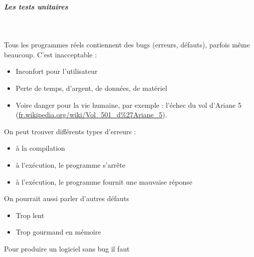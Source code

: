 \documentclass[11pt,a4paper]{article}
\begin{document}
		\subparagraph{Les tests unitaires} 
		
					\textcolor{white}{.} \par
				
          Tous les programmes r\'eels contiennent des bugs (erreurs, d\'efauts), parfois m\^eme beaucoup.
          C'est inacceptable :
          
					\begin{itemize}
				
			\item Inconfort pour l'utilisateur
			\item Perte de temps, d'argent, de donn\'ees, de mat\'eriel
			\item Voire danger pour la vie humaine, par exemple : l'\'echec du vol d'Ariane 5 (\url{fr.wikipedia.org/wiki/Vol\_501\_d\%27Ariane\_5}).
					\end{itemize}
				
            \par
        
          On peut trouver diff\'erents types d'erreurs : 
          
					\begin{itemize}
				
			\item \`a la compilation
			\item \`a l'ex\'ecution, le programme s'arr\^ete
			\item \`a l'ex\'ecution, le programme fournit une mauvaise r\'eponse
					\end{itemize}
				
          On pourrait aussi parler d'autres d\'efauts
          
					\begin{itemize}
				
			\item Trop lent
			\item Trop gourmand en m\'emoire
					\end{itemize}
				
            \par
        
        Pour produire un logiciel sans bug il faut
         
\end{document}
